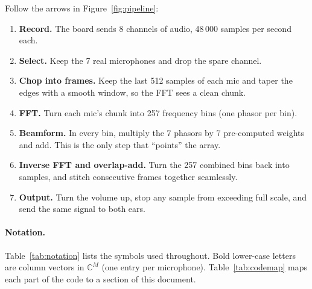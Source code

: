 \documentclass[11pt]{article}
\begin{document}
\begin{inplainwords}
Follow the arrows in Figure~\ref{fig:pipeline}:
\begin{enumerate}[nosep]
\item \textbf{Record.} The board sends 8 channels of audio, 48\,000 samples per second each.
\item \textbf{Select.} Keep the 7 real microphones and drop the spare channel.
\item \textbf{Chop into frames.} Keep the last 512 samples of each mic and taper the edges
  with a smooth window, so the FFT sees a clean chunk.
\item \textbf{FFT.} Turn each mic's chunk into 257 frequency bins (one phasor per bin).
\item \textbf{Beamform.} In every bin, multiply the 7 phasors by 7 pre-computed weights and add.
  This is the only step that ``points'' the array.
\item \textbf{Inverse FFT and overlap-add.} Turn the 257 combined bins back into samples, and
  stitch consecutive frames together seamlessly.
\item \textbf{Output.} Turn the volume up, stop any sample from exceeding full scale, and send
  the same signal to both ears.
\end{enumerate}
\end{inplainwords}

\paragraph{Notation.}
Table~\ref{tab:notation} lists the symbols used throughout. Bold lower-case letters are column
vectors in $\mathbb{C}^M$ (one entry per microphone). Table~\ref{tab:codemap} maps each part
of the code to a section of this document.
\end{document}
